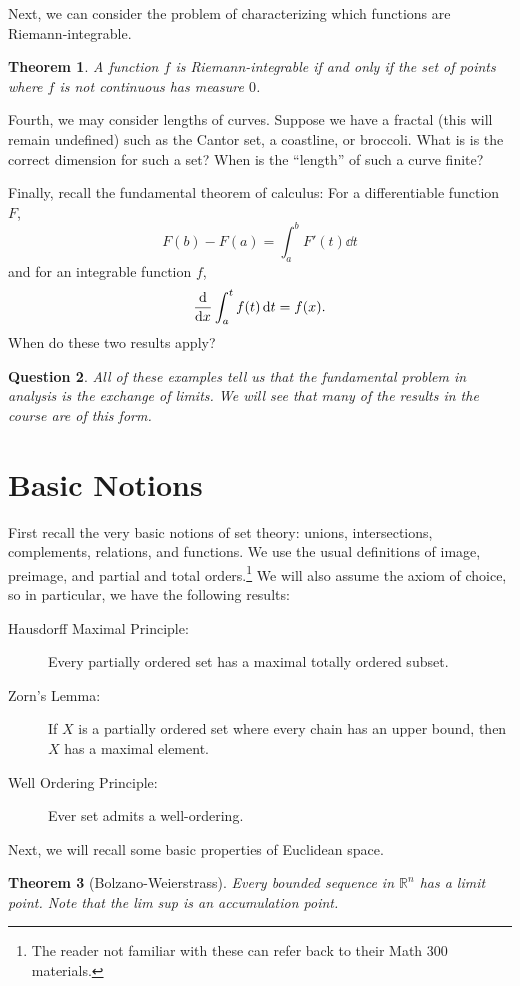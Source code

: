 \documentclass[leqno, openany]{memoir}
\newtheorem{thm}{Theorem}[chapter]
\newtheorem{quest}[thm]{Question}
\theoremstyle{definition}
\theoremstyle{remark}
\theoremstyle{plain}
\theoremstyle{definition}
\theoremstyle{remark}
\newcommand{\R}{\mathbb{R}}
\begin{document}
Next, we can consider the problem of characterizing which functions are Riemann-integrable.

\begin{thm}
    A function $f$ is Riemann-integrable if and only if the set of points where $f$ is not continuous has measure $0$.
\end{thm}

Fourth, we may consider lengths of curves. Suppose we have a fractal (this will remain undefined) such as the Cantor set, a coastline, or broccoli. What is is the correct dimension for such a set? When is the ``length'' of such a curve finite?

Finally, recall the fundamental theorem of calculus: For a differentiable function $F$, 
\[ F(b) - F(a) = \int_a^b F'(t) \dd{t} \]
and for an integrable function $f$, 
\[ \dv{x} \int_a^t f(t) \dd{t} = f(x). \]
When do these two results apply?

\begin{quest}
    All of these examples tell us that the fundamental problem in analysis is the exchange of limits. We will see that many of the results in the course are of this form.
\end{quest}

\section{Basic Notions}%
\label{sec:basic_notions}

First recall the very basic notions of set theory: unions, intersections, complements, relations, and functions. We use the usual definitions of image, preimage, and partial and total orders.\footnote{The reader not familiar with these can refer back to their Math 300 materials.} We will also assume the axiom of choice, so in particular, we have the following results:
\begin{description}
    \item[Hausdorff Maximal Principle:] Every partially ordered set has a maximal totally ordered subset. 
    \item[Zorn's Lemma:] If $X$ is a partially ordered set where every chain has an upper bound, then $X$ has a maximal element.
    \item[Well Ordering Principle:] Ever set admits a well-ordering.
\end{description}

Next, we will recall some basic properties of Euclidean space.

\begin{thm}[Bolzano-Weierstrass]
    Every bounded sequence in $\R^n$ has a limit point. Note that the lim sup is an accumulation point.
\end{thm}
\end{document}
